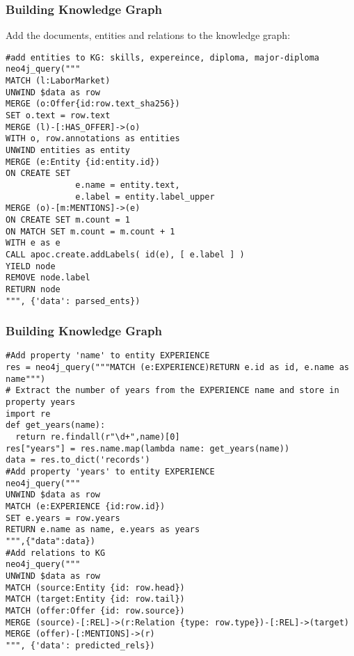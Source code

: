 \begin{frame}[fragile]\frametitle{Building Knowledge Graph}

Add the documents, entities and relations to the knowledge graph:
 
\begin{lstlisting}
#add entities to KG: skills, expereince, diploma, major-diploma
neo4j_query("""
MATCH (l:LaborMarket)
UNWIND $data as row
MERGE (o:Offer{id:row.text_sha256})
SET o.text = row.text
MERGE (l)-[:HAS_OFFER]->(o)
WITH o, row.annotations as entities
UNWIND entities as entity
MERGE (e:Entity {id:entity.id})
ON CREATE SET 
              e.name = entity.text,
              e.label = entity.label_upper
MERGE (o)-[m:MENTIONS]->(e)
ON CREATE SET m.count = 1
ON MATCH SET m.count = m.count + 1
WITH e as e
CALL apoc.create.addLabels( id(e), [ e.label ] )
YIELD node
REMOVE node.label
RETURN node
""", {'data': parsed_ents})
\end{lstlisting}
	 
\end{frame}

\begin{frame}[fragile]\frametitle{Building Knowledge Graph}


\begin{lstlisting}
#Add property 'name' to entity EXPERIENCE
res = neo4j_query("""MATCH (e:EXPERIENCE)RETURN e.id as id, e.name as name""")
# Extract the number of years from the EXPERIENCE name and store in property years
import re
def get_years(name):
  return re.findall(r"\d+",name)[0]
res["years"] = res.name.map(lambda name: get_years(name))
data = res.to_dict('records')
#Add property 'years' to entity EXPERIENCE
neo4j_query("""
UNWIND $data as row
MATCH (e:EXPERIENCE {id:row.id})
SET e.years = row.years
RETURN e.name as name, e.years as years
""",{"data":data})
#Add relations to KG
neo4j_query("""
UNWIND $data as row
MATCH (source:Entity {id: row.head})
MATCH (target:Entity {id: row.tail})
MATCH (offer:Offer {id: row.source})
MERGE (source)-[:REL]->(r:Relation {type: row.type})-[:REL]->(target)
MERGE (offer)-[:MENTIONS]->(r)
""", {'data': predicted_rels})	 
\end{lstlisting}

\end{frame}


